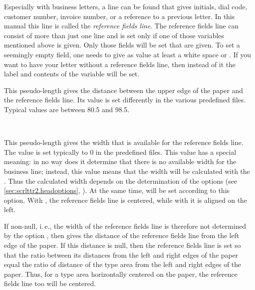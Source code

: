 Especially with business letters, a line can be found that gives
initials, dial code, customer number, invoice number, or a reference
to a previous letter.  In this manual this line is called the
\emph{reference fields line}. The reference fields line can consist of
more than just one line and is set only if one of those variables
mentioned above is given. Only those fields will be set that are
given. To set a seemingly empty field, one needs to give as value at
least a white space or . If you want to have your letter
without a reference fields line, then instead of it the label and
contents of the variable  will be set.


\begin{Declaration}
\end{Declaration}
%
This pseudo-length gives the distance between the upper edge of the
paper and the reference fields line. Its value is set differently in
the various predefined  files. Typical values are between
80.5 and 98.5.
%
%


\begin{Declaration}
  \\
\end{Declaration}
%
This pseudo-length gives the width that is available for the reference
fields line.  The value is set typically to 0 in the
predefined  files.  This value has a special meaning: in no
way does it determine that there is no available width for the
business line; instead, this value means that the width will be
calculated with the . Thus the calculated width depends
on the determination of the options  (see
\autoref{sec:scrlttr2.headoptions},
). At the same time,
 will be set according to this option. With
, the reference fields line is centered,
while with  it is aligned on the left.

If  non-null, i.\,e., the width of the reference
fields line is therefore not determined by the option
, then  gives the distance of the
reference fields line from the left edge of the paper. If this
distance is null, then the reference fields line is set so that the
ratio between its distances from the left and right edges of the paper
equal the ratio of distance of the type area from the left and right
edges of the paper. Thus, for a type area horizontally centered on the
paper, the reference fields line too will be centered.

